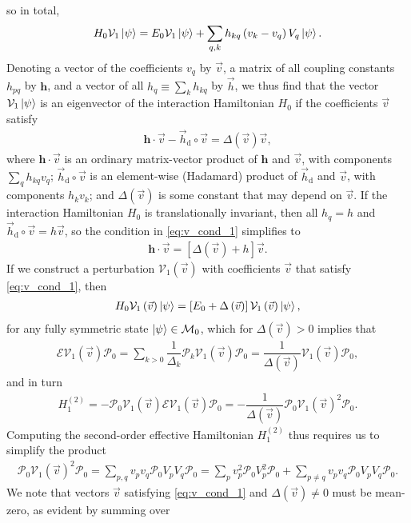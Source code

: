 \documentclass[nofootinbib,notitlepage,11pt]{revtex4-2}
\newcommand{\f}[2]{\dfrac{#1}{#2}} %
\newcommand{\p}[1]{\left(#1\right)} %
\renewcommand{\sp}[1]{\left[#1\right]} %
\renewcommand{\c}{\cdot} %
\renewcommand{\oc}{\circ} %
\newcommand{\m}{\bm} %
\renewcommand{\v}{\vec} %
\newcommand{\1}{\mathds{1}}
\renewcommand{\d}{\text{d}}
\newcommand{\E}{\mathcal{E}}
\newcommand{\M}{\mathcal{M}}
\renewcommand{\P}{\mathcal{P}}
\newcommand{\V}{\mathcal{V}}
\begin{document}
so in total,
\begin{align}
  H_0 \V_1 \ket\psi
  = E_0 \V_1 \ket\psi + \sum_{q,k} h_{kq} \p{v_k - v_q} V_q \ket\psi.
  \label{eq:H_V1_psi}
\end{align}
Denoting a vector of the coefficients $v_q$ by $\v v$, a matrix of all
coupling constants $h_{pq}$ by $\m h$, and a vector of all
$h_q\equiv\sum_k h_{kq}$ by $\v h$, we thus find that the vector
$\V_1\ket\psi$ is an eigenvector of the interaction Hamiltonian $H_0$
if the coefficients $\v v$ satisfy
\begin{align}
  \m h \c \v v - \v h_\d\oc\v v = \Delta\p{\v v} \v v,
  \label{eq:v_cond_1}
\end{align}
where $\m h\c\v v$ is an ordinary matrix-vector product of $\m h$ and
$\v v$, with components $\sum_q h_{kq} v_q$; $\v h_\d\oc\v v$ is an
element-wise (Hadamard) product of $\v h_\d$ and $\v v$, with
components $h_k v_k$; and $\Delta\p{\v v}$ is some constant that may
depend on $\v v$.  If the interaction Hamiltonian $H_0$ is
translationally invariant, then all $h_q=h$ and
$\v h_\d\oc\v v=h\v v$, so the condition in \eqref{eq:v_cond_1}
simplifies to
\begin{align}
  \m h \c\v v = \sp{\Delta\p{\v v}+h} \v v.
\end{align}
If we construct a perturbation $\V_1\p{\v v}$ with coefficients $\v v$
that satisfy \eqref{eq:v_cond_1}, then
\begin{align}
  H_0 \V_1\p{\v v} \ket\psi
  = \sp{E_0 + \Delta\p{\v v}} \V_1\p{\v v} \ket\psi,
\end{align}
for any fully symmetric state $\ket\psi\in\M_0$, which for
$\Delta\p{\v v}>0$ implies that
\begin{align}
  \E \V_1\p{\v v} \P_0
  = \sum_{k>0} \f1{\Delta_k} \P_k \V_1\p{\v v} \P_0
  = \f1{\Delta\p{\v v}} \V_1\p{\v v} \P_0,
\end{align}
and in turn
\begin{align}
  H_1^{(2)}
  = -\P_0 \V_1\p{\v v} \E \V_1\p{\v v} \P_0
  = -\f1{\Delta\p{\v v}} \P_0 \V_1\p{\v v}^2 \P_0.
\end{align}
Computing the second-order effective Hamiltonian $H_1^{(2)}$ thus
requires us to simplify the product
\begin{align}
  \P_0 \V_1\p{\v v}^2 \P_0
  = \sum_{p,q} v_p v_q \P_0 V_p V_q \P_0
  = \sum_p v_p^2 \P_0 V_p^2 \P_0
  + \sum_{p\ne q} v_p v_q \P_0 V_p V_q \P_0.
  \label{eq:PVVP_start}
\end{align}
We note that vectors $\v v$ satisfying \eqref{eq:v_cond_1} and
$\Delta\p{\v v}\ne 0$ must be mean-zero, as evident by summing over
\end{document}
